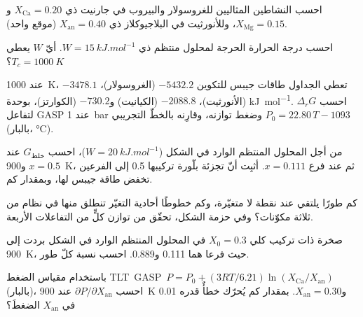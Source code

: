\begin{exercise}[$\star$]\label{exo:b3:petrological-thermodynamics:3}
احسب النشاطين المثاليين للغروسولار والبيروب في جارنيت ذي
$X_{\text{Ca}} = 0.20$ و$X_{\text{Mg}} = 0.15$، وللأنورثيت في
البلاجيوكلاز ذي $X_{\text{an}} = 0.40$ (موقع واحد).
\end{exercise}

\begin{exercise}[$\star$]\label{exo:b3:petrological-thermodynamics:4}
احسب درجة الحرارة الحرجة لمحلول منتظم ذي $W =
\qty{15}{kJ.mol^{-1}}$. أيّ $W$ يعطي $T_c = \qty{1000}{K}$؟
\end{exercise}

\begin{exercise}[$\star\star$]\label{exo:b3:petrological-thermodynamics:5}
عند \qty{1000}{K}، تعطي الجداول طاقات جيبس للتكوين
$-5432.2$ (الغروسولار)، $-3478.1$ (الأنورثيت)، $-2088.8$ (الكيانيت) و$-730.2$
(الكوارتز)، بوحدة \unit{kJ.mol^{-1}}. احسب $\Delta_rG$ لتفاعل GASP عند
\qty{1}{bar} وضغط توازنه، وقارِنه بالخطّ التجريبي
$P_0 = 22.80\,T - 1093$ (بالبار، \unit{\celsius}).
\end{exercise}

\begin{exercise}[$\star\star$]\label{exo:b3:petrological-thermodynamics:6}
من أجل المحلول المنتظم الوارد في الشكل ($W = \qty{20}{kJ.mol^{-1}}$)، احسب
$G_{\text{خلط}}$ عند $x = 0.5$ و\qty{900}{K}، ثم عند فرع  $x =
0.111$. أثبِت أنّ تجزئة بلّورة تركيبها 0.5 إلى الفرعين
تخفض طاقة جيبس لها، وبمقدار كم.
\end{exercise}

\begin{exercise}[$\star\star$]\label{exo:b3:petrological-thermodynamics:7}
كم طورًا يلتقي عند نقطة لا متغيّرة، وكم خطوطًا أحادية التغيّر
تنطلق منها في نظام من ثلاثة مكوّنات؟ وفي حزمة الشكل،
تحقّق من توازن كلٍّ من التفاعلات الأربعة.
\end{exercise}

\begin{exercise}[$\star\star$]\label{exo:b3:petrological-thermodynamics:8}
صخرة ذات تركيب كلي $X_0 = 0.3$ في المحلول المنتظم الوارد في الشكل
بردت إلى \qty{900}{K}، حيث فرعا  هما 0.111 و0.889.
احسب نسبة كلّ طور.
\end{exercise}

\begin{exercise}[$\star\star$]\label{exo:b3:petrological-thermodynamics:9}
باستخدام مقياس الضغط \mbox{\textdir TLT GASP $P = P_0 + (3RT/6.21)\ln(X_{\text{Ca}}/X_{\text{an}})$}
(بالبار)، احسب $\partial P/\partial X_{\text{an}}$ عند \qty{900}{K}
و$X_{\text{an}} = 0.30$. بمقدار كم يُحرّك خطأٌ قدره 0.01 في $X_{\text{an}}$
الضغطَ؟
\end{exercise}

